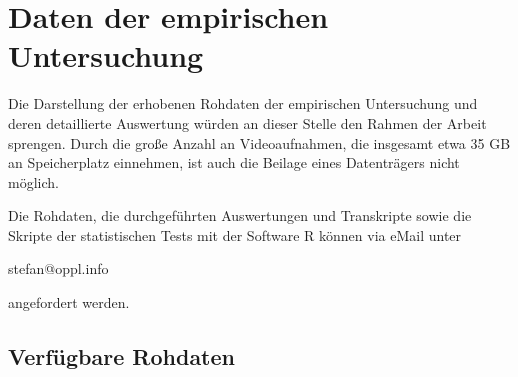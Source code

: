 \chapter{Daten der empirischen Untersuchung} %
\label{cha:daten_der_empirischen_untersuchung}

Die Darstellung der erhobenen Rohdaten der empirischen Untersuchung und deren detaillierte Auswertung würden an dieser Stelle den Rahmen der Arbeit sprengen. Durch die große Anzahl an Videoaufnahmen, die insgesamt etwa 35 \gls{GB} an Speicherplatz einnehmen, ist auch die Beilage eines Datenträgers nicht möglich. 

Die Rohdaten, die durchgeführten Auswertungen und Transkripte sowie die Skripte der statistischen Tests mit der Software R können via eMail unter

\begin{center} stefan@oppl.info \end{center}

angefordert werden. 

\section{Verfügbare Rohdaten} %
\label{sec:verfügbare_rohdaten}

